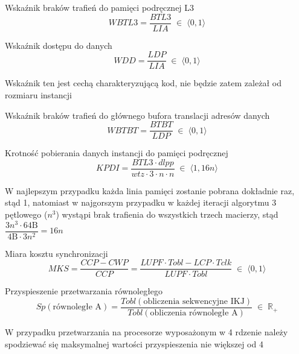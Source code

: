 \documentclass[12pt,a4paper]{article}
\begin{document}
Wskaźnik braków trafień do pamięci podręcznej L3
\begin{equation}
WBTL3 = \frac{BTL3}{LIA}
\; \in \; \langle 0,1 \rangle
\end{equation}

Wskaźnik dostępu do danych
\begin{equation}
WDD = \frac{LDP}{LIA}
\; \in \; \langle 0,1 \rangle
\end{equation}

\begin{footnotesize}
\begin{center}
Wskaźnik ten jest cechą charakteryzującą kod, nie będzie zatem zależał od rozmiaru instancji 
\end{center}
\end{footnotesize}


Wskaźnik braków trafień do głównego bufora translacji adresów danych
\begin{equation}
WBTBT = \frac{BTBT}{LDP}
\; \in \; \langle 0,1 \rangle
\end{equation}

Krotność pobierania danych instancji do pamięci podręcznej
\begin{equation}
KPDI = \frac{BTL3 \cdot dlpp}{wtz \cdot 3 \cdot n \cdot n}
\; \in \; \langle 1,16n \rangle
\end{equation}
\begin{footnotesize}
\begin{center}
W najlepszym przypadku każda linia pamięci zostanie pobrana dokładnie raz, stąd 1, natomiast w najgorszym przypadku w każdej iteracji algorytmu 3 pętlowego ($n^3$) wystąpi brak trafienia do wszystkich trzech macierzy, stąd $\dfrac{3n^3 \cdot 64\text{B}}{4\text{B} \cdot 3n^2} = 16n$
\end{center}
\end{footnotesize}

Miara kosztu synchronizacji
\begin{equation}
MKS = \frac{CCP - CWP}{CCP} = \frac{LUPF \cdot Tobl - LCP \cdot Tclk}{LUPF \cdot Tobl}
\; \in \; \langle 0,1 \rangle
\end{equation}

Przyspieszenie przetwarzania równoległego
\begin{equation}
Sp(\text{równoległe A}) = \frac{Tobl(\text{obliczenia sekwencyjne IKJ})}{Tobl(\text{obliczenia równoległe A})}
\; \in \; \mathbb{R}_+
\end{equation}
\begin{footnotesize}
\begin{center}
W przypadku przetwarzania na procesorze wyposażonym w 4 rdzenie należy spodziewać się maksymalnej wartości przyspieszenia nie większej od 4
\end{center}
\end{footnotesize}
\end{document}
